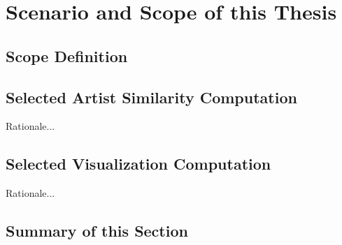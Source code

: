 \section{Scenario and Scope of this Thesis}

\subsection{Scope Definition}

\subsection{Selected Artist Similarity Computation}

Rationale...

\subsection{Selected Visualization Computation}

Rationale...

\subsection{Summary of this Section}